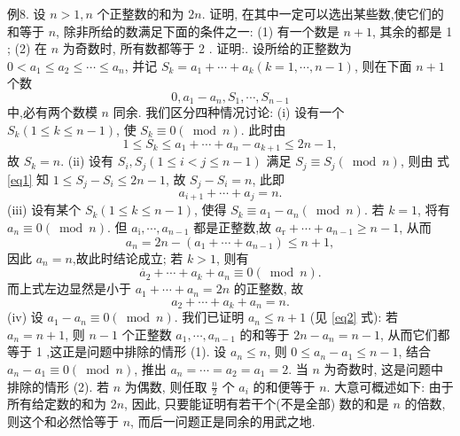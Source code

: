 例8. 设 $n>1, n$ 个正整数的和为 $2 n$. 证明, 在其中一定可以选出某些数,使它们的和等于 $n$, 除非所给的数满足下面的条件之一:
(1) 有一个数是 $n+1$, 其余的都是 1 ;
(2) 在 $n$ 为奇数时, 所有数都等于 2 .
证明:. 设所给的正整数为 $0<a_1 \leqslant a_2 \leqslant \cdots \leqslant a_n$, 并记 $S_k=a_1+\cdots+ a_k(k=1, \cdots, n-1)$, 则在下面 $n+1$ 个数
$$
0, a_1-a_n, S_1, \cdots, S_{n-1}
$$
中,必有两个数模 $n$ 同余.
我们区分四种情况讨论:
(i) 设有一个 $S_k(1 \leqslant k \leqslant n-1)$, 使 $S_k \equiv 0(\bmod n)$. 此时由
$$
1 \leqslant S_k \leqslant a_1+\cdots+a_n-a_{k+1} \leqslant 2 n-1, \label{eq1}
$$
故 $S_k=n$.
(ii) 设有 $S_i, S_j(1 \leqslant i<j \leqslant n-1)$ 满足 $S_j \equiv S_j(\bmod n)$, 则由 式\ref{eq1} 知 $1 \leqslant S_j-S_i \leqslant 2 n-1$, 故 $S_j-S_i=n$, 此即
$$
a_{i+1}+\cdots+a_j=n .
$$
(iii) 设有某个 $S_k(1 \leqslant k \leqslant n-1)$, 使得 $S_k \equiv a_1-a_n(\bmod n)$. 若 $k=1$, 将有 $a_n \equiv 0(\bmod n)$. 但 $a_{\mathrm{i}}, \cdots, a_{n-1}$ 都是正整数,故 $a_{\mathrm{r}}+\cdots+a_{n-1} \geqslant n-1$, 从而
$$
a_n=2 n-\left(a_1+\cdots+a_{n-1}\right) \leqslant n+1, \label{eq2}
$$
因此 $a_n=n$,故此时结论成立; 若 $k>1$, 则有
$$
\dot{a_2}+\cdots+a_k+a_n \equiv 0(\bmod n) .
$$
而上式左边显然是小于 $a_1+\cdots+a_n=2 n$ 的正整数, 故
$$
a_2+\cdots+a_k+a_n=n .
$$
(iv) 设 $a_1-a_n \equiv 0(\bmod n)$. 我们已证明 $a_n \leqslant n+1$ (见 \ref{eq2} 式): 若 $a_n= n+1$, 则 $n-1$ 个正整数 $a_1, \cdots, a_{n-1}$ 的和等于 $2 n-a_n=n-1$, 从而它们都等于 1 ,这正是问题中排除的情形 (1).
设 $a_n \leqslant n$, 则 $0 \leqslant a_n-a_1 \leqslant n-1$, 结合 $a_n-a_1 \equiv 0(\bmod n)$, 推出 $a_n=\cdots=a_2=a_1=2$. 当 $n$ 为奇数时, 这是问题中排除的情形 (2). 若 $n$ 为偶数, 则任取 $\frac{n}{2}$ 个 $a_i$ 的和便等于 $n$.
大意可概述如下: 由于所有给定数的和为 $2 n$, 因此, 只要能证明有若干个(不是全部) 数的和是 $n$ 的倍数, 则这个和必然恰等于 $n$, 而后一问题正是同余的用武之地.



